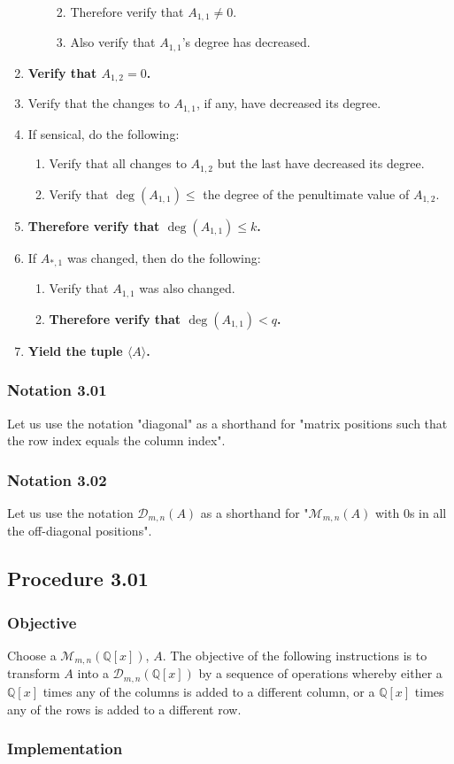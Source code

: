 \documentclass[twocolumn]{article}
\newcommand{\notation}[1]{\subsubsection*{Notation #1}}
\newcommand{\procedure}[2][]{\subsection*{Procedure #2 \ifthenelse{\equal{#1}{}}{}{(#1)}}\label{sec:procedure #2}}
\newcommand{\objective}{\subsubsection*{Objective}}
\newcommand{\implementation}{\subsubsection*{Implementation}}
\begin{document}
\begin{enumerate}
\begin{enumerate}
\begin{enumerate}
\begin{enumerate}
							\end{enumerate}
							\item Therefore verify that $A_{1,1}\ne 0$.
							\item Also verify that $A_{1,1}$'s degree has decreased.
						\end{enumerate}
					\end{enumerate}
					\item \textbf{Verify that $A_{1,2}=0$.}
					\item Verify that the changes to $A_{1,1}$, if any, have decreased its degree.
					\item If sensical, do the following:
					\begin{enumerate}
						\item Verify that all changes to $A_{1,2}$ but the last have decreased its degree.
						\item Verify that $\deg(A_{1,1})\le$ the degree of the penultimate value of $A_{1,2}$.
					\end{enumerate}
					\item \textbf{Therefore verify that $\deg(A_{1,1})\le k$.}
					\item If $A_{*,1}$ was changed, then do the following:
					\begin{enumerate}
						\item Verify that $A_{1,1}$ was also changed.
						\item \textbf{Therefore verify that $\deg(A_{1,1})<q$.}
					\end{enumerate}
					\item \textbf{Yield the tuple $\langle A\rangle$.}
				\end{enumerate}
		\notation{3.01}
			Let us use the notation "diagonal" as a shorthand for "matrix positions such that the row index equals the column index".
		\notation{3.02}
			Let us use the notation $\mathcal{D}_{m,n}(A)$ as a shorthand for "$\mathcal{M}_{m,n}(A)$ with $0$s in all the off-diagonal positions".
		\procedure{3.01}
			\objective
				Choose a $\mathcal{M}_{m,n}(\mathbb{Q}[x])$, $A$. The objective of the following instructions is to transform $A$ into a $\mathcal{D}_{m,n}(\mathbb{Q}[x])$ by a sequence of operations whereby either a $\mathbb{Q}[x]$ times any of the columns is added to a different column, or a $\mathbb{Q}[x]$ times any of the rows is added to a different row.
			\implementation
\end{document}
